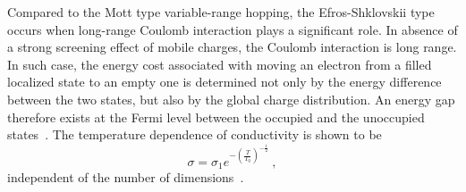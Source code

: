Compared to the Mott type variable-range hopping, the Efros-Shklovskii type occurs when long-range Coulomb interaction plays a significant role. In absence of a strong screening effect of mobile charges, the Coulomb interaction is long range. In such case, the energy cost associated with moving an electron from a filled localized state to an empty one is determined not only by the energy difference between the two states, but also by the global charge distribution. An energy gap therefore exists at the Fermi level between the occupied and the unoccupied states~\cite{pollak1970}. The temperature dependence of conductivity is shown to be%
\begin{equation}%
    \sigma = \sigma_1 e^{-\left(\frac{T}{T_0}\right)^{-\frac{1}{2}}}~,\label{eq:vrh_efros}%
\end{equation}%
independent of the number of dimensions~\cite{schklovskii_efros, efros1975}.